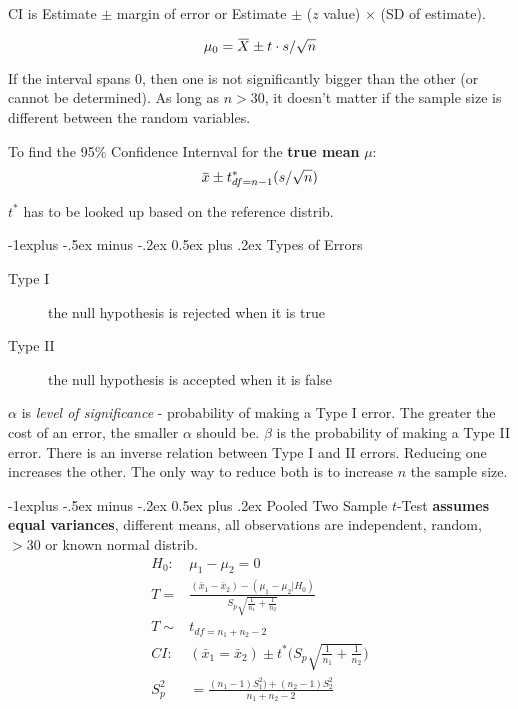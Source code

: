 \documentclass[10pt,landscape]{article}
\makeatletter
\renewcommand{\subsection}{\@startsection{subsection}{2}{0mm}%
                                {-1explus -.5ex minus -.2ex}%
                                {0.5ex plus .2ex}%
                                {\normalfont\normalsize\bfseries}}
\newcommand{\overbar}[1]{\mkern 1.5mu\overline{\mkern-1.5mu#1\mkern-1.5mu}\mkern 1.5mu}
\makeatother
\begin{document}
\begin{multicols*}{3}
CI is Estimate $\pm$ margin of error or Estimate $\pm$ ($z$ value) $\times$ (SD of estimate).

\[
\mu_0 = \overbar{X} \pm t\cdot s/\sqrt{n}
\]

If the interval spans 0, then one is not significantly bigger than the other (or cannot be determined). 
As long as $n > 30$, it doesn't matter if the sample size is different between the random variables.

To find the 95\% Confidence Internval for the \textbf{true mean} $\mu$:
\[
\overbar{x} \pm t^*_{df=n-1} (s/\sqrt{n})
\]

$t^*$ has to be looked up based on the reference distrib.



\subsection{Types of Errors}
\begin{description}
\item[Type I]the null hypothesis is rejected when it is true
\item[Type II] the null hypothesis is accepted when it is false
\end{description}
$\alpha$ is \textit{level of significance} - probability of making a Type I error. The greater the cost of an error, the smaller $\alpha$ should be.
$\beta$ is the probability of making a Type II error. There is an inverse relation between Type I and II errors. Reducing one increases the other. The only way to reduce both is to increase $n$ the sample size.

\subsection{Pooled Two Sample $t$-Test}
\textbf{assumes equal variances}, different means, all observations are independent, random, $> 30$ or known normal distrib. 
\begin{align*}
H_0 :& \mu_1 - \mu_2 = 0 \\
T =& \frac{(\bar{x}_1 - \bar{x}_2) - (\mu_1 - \mu_2 | H_0) } {S_p \sqrt{\frac{1}{n_1} + \frac{1}{n_2}  } } \\
T  \sim& t_{df = n_1 + n_2 - 2} \\
CI: & (\bar{x}_1 = \bar{x}_2) \pm t^* \bigg(S_p \sqrt{\frac{1}{n_1} + \frac{1}{n_2}     }   \bigg) \\
S_p^2 &= \frac {(n_1 - 1)S_1^2) + (n_2 - 1)S^2_2  } { n_1 + n_2 -2 } \\
\end{align*}


\end{multicols*}
\end{document}
